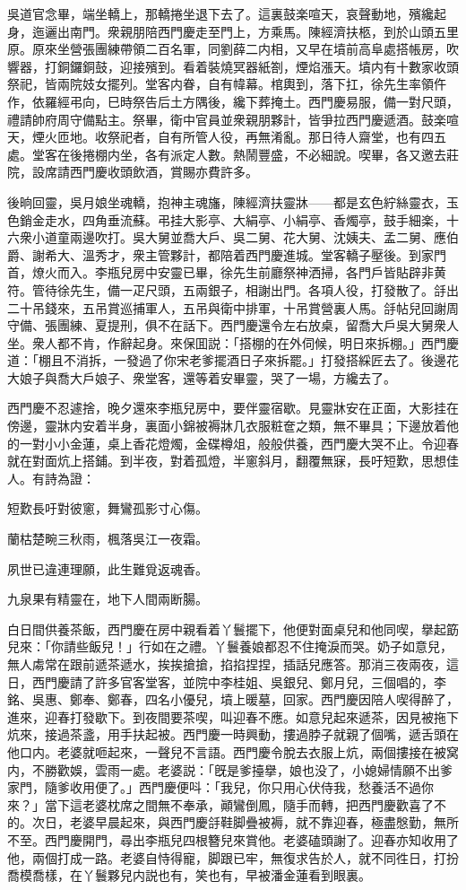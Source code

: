 吳道官念畢，端坐轎上，那轎捲坐退下去了。這裏鼓楽喧天，哀聲動地，殯纔起身，迤邐出南門。衆親朋陪西門慶走至門上，方乘馬。陳經濟扶柩，到於山頭五里原。原來坐營張團練帶領二百名軍，同劉薛二内相，又早在墳前高阜處搭帳房，吹響器，打銅鑼銅鼓，迎接殯到。看着裝燒冥器紙劄，煙焰漲天。墳内有十數家收頭祭祀，皆兩院妓女擺列。堂客内眷，自有幃幕。棺輿到，落下扛，徐先生率領仵作，依羅經弔向，巳時祭告后土方隅後，纔下葬掩土。西門慶易服，備一對尺頭，禮請帥府周守備點主。祭畢，衛中官員並衆親朋夥計，皆爭拉西門慶遞酒。鼓楽喧天，煙火匝地。收祭祀者，自有所管人役，再無淆亂。那日待人齋堂，也有四五處。堂客在後捲棚内坐，各有派定人數。熱鬧豐盛，不必細說。喫畢，各又邀去莊院，設席請西門慶收頭飲酒，賞賜亦費許多。

後晌回靈，吳月娘坐魂轎，抱神主魂旛，陳經濟扶靈牀——都是玄色紵絲靈衣，玉色銷金走水，四角垂流蘇。弔挂大影亭、大絹亭、小絹亭、香燭亭，鼓手細楽，十六衆小道童兩邊吹打。吳大舅並喬大戶、吳二舅、花大舅、沈姨夫、孟二舅、應伯爵、謝希大、溫秀才，衆主管夥計，都陪着西門慶進城。堂客轎子壓後。到家門首，燎火而入。李瓶兒房中安靈已畢，徐先生前廳祭神洒掃，各門戶皆貼辟非黄符。管待徐先生，備一疋尺頭，五兩銀子，相謝出門。各項人役，打發散了。㧱出二十吊錢來，五吊賞巡捕軍人，五吊與衛中排軍，十吊賞營裏人馬。㧱帖兒回謝周守備、張團練、夏提刑，俱不在話下。西門慶還令左右放桌，留喬大戶吳大舅衆人坐。衆人都不肯，作辭起身。來保囬説：「搭棚的在外伺候，明日來拆棚。」西門慶道：「棚且不消拆，一發過了你宋老爹擺酒日子來拆罷。」打發搭綵匠去了。後邊花大娘子與喬大戶娘子、衆堂客，還等着安畢靈，哭了一場，方纔去了。

西門慶不忍遽捨，晚夕還來李瓶兒房中，要伴靈宿歇。見靈牀安在正面，大影挂在傍邊，靈牀内安着半身，裏面小錦被褥牀几衣服粧奩之類，無不畢具；下邊放着他的一對小小金蓮，桌上香花燈燭，金碟樽俎，般般供養，西門慶大哭不止。令迎春就在對面炕上搭鋪。到半夜，對着孤燈，半窻斜月，翻覆無寐，長吁短歎，思想佳人。有詩為證：

\begin{myquote}
短歎長吁對彼窻，舞鸞孤影寸心傷。

蘭枯楚畹三秋雨，楓落吳江一夜霜。

夙世已違連理願，此生難覓返魂香。

九泉果有精靈在，地下人間兩断腸。
\end{myquote}

白日間供養茶飯，西門慶在房中親看着丫鬟擺下，他便對面桌兒和他同喫，擧起筯兒來：「你請些飯兒！」行如在之禮。丫鬟養娘都忍不住掩淚而哭。奶子如意兒，無人䖏常在跟前遞茶遞水，挨挨搶搶，掐掐捏捏，插話兒應答。那消三夜兩夜，這日，西門慶請了許多官客堂客，並院中李桂姐、吳銀兒、鄭月兒，三個唱的，李銘、吳惠、鄭奉、鄭春，四名小優兒，墳上暖墓，回家。西門慶因陪人喫得醉了，進來，迎春打發歇下。到夜間要茶喫，叫迎春不應。如意兒起來遞茶，因見被拖下炕來，接過茶盞，用手扶起被。西門慶一時興動，摟過脖子就親了個嘴，遞舌頭在他口内。老婆就咂起來，一聲兒不言語。西門慶令脫去衣服上炕，兩個摟接在被窝内，不勝歡娛，雲雨一處。老婆説：「旣是爹擡擧，娘也没了，小媳婦情願不出爹家門，隨爹收用便了。」西門慶便呌：「我兒，你只用心伏侍我，愁養活不過你來？」當下這老婆枕席之間無不奉承，顚鸞倒鳳，隨手而轉，把西門慶歡喜了不的。次日，老婆早晨起來，與西門慶㧱鞋脚疊被褥，就不靠迎春，極盡慇勤，無所不至。西門慶開門，尋出李瓶兒四根簪兒來賞他。老婆磕頭謝了。迎春亦知收用了他，兩個打成一路。老婆自恃得寵，脚跟已牢，無復求告於人，就不同徃日，打扮喬模喬樣，在丫鬟夥兒内説也有，笑也有，早被潘金蓮看到眼裏。

